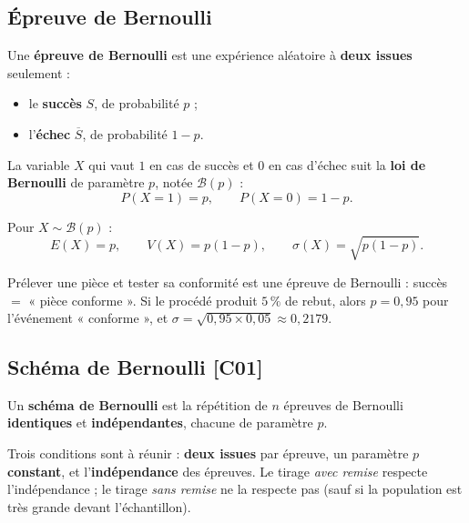 \documentclass[a4paper,11pt]{article}
\begin{document}
\subsection{Épreuve de Bernoulli}

\begin{definition}
Une \textbf{épreuve de Bernoulli} est une expérience aléatoire à \textbf{deux issues} seulement :
\begin{itemize}
  \item le \textbf{succès} $S$, de probabilité $p$ ;
  \item l'\textbf{échec} $\overline{S}$, de probabilité $1 - p$.
\end{itemize}
\end{definition}

\begin{definition}
La variable $X$ qui vaut $1$ en cas de succès et $0$ en cas d'échec suit la \textbf{loi de Bernoulli} de paramètre $p$, notée $\mathcal{B}(p)$ :
\[
P(X = 1) = p, \qquad P(X = 0) = 1 - p.
\]
\end{definition}

\begin{theoreme}
Pour $X \sim \mathcal{B}(p)$ :
\[
E(X) = p, \qquad V(X) = p(1 - p), \qquad \sigma(X) = \sqrt{p(1 - p)}.
\]
\end{theoreme}

\begin{appliindus}
Prélever une pièce et tester sa conformité est une épreuve de Bernoulli : succès $=$ « pièce conforme ». Si le procédé produit $5\,\%$ de rebut, alors $p = 0{,}95$ pour l'événement « conforme », et $\sigma = \sqrt{0{,}95 \times 0{,}05} \approx 0{,}2179$.
\end{appliindus}

\subsection{Schéma de Bernoulli \hfill {\normalsize\color{uimmred}[C01]}}

\begin{definition}
Un \textbf{schéma de Bernoulli} est la répétition de $n$ épreuves de Bernoulli \textbf{identiques} et \textbf{indépendantes}, chacune de paramètre $p$.
\end{definition}

\begin{remarque}
Trois conditions sont à réunir : \textbf{deux issues} par épreuve, un paramètre $p$ \textbf{constant}, et l'\textbf{indépendance} des épreuves. Le tirage \emph{avec remise} respecte l'indépendance ; le tirage \emph{sans remise} ne la respecte pas (sauf si la population est très grande devant l'échantillon).
\end{remarque}
\end{document}
